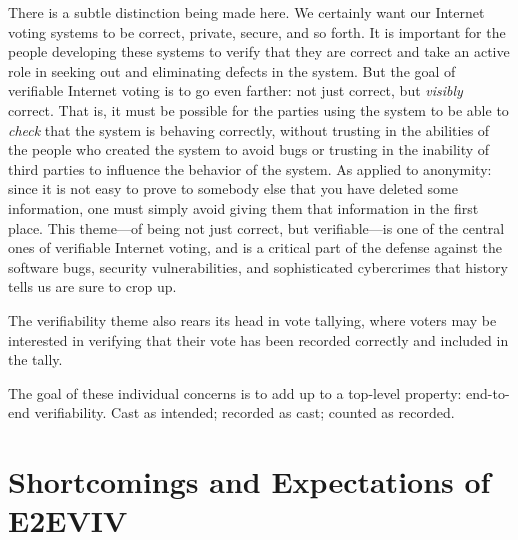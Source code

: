 There is a subtle distinction being made here. We certainly want our
Internet voting systems to be correct, private, secure, and so forth. It is
important for the people developing these systems to verify that they are
correct and take an active role in seeking out and eliminating defects in
the system. But the goal of verifiable Internet voting is to go even
farther: not just correct, but \emph{visibly} correct. That is, it must be
possible for the parties using the system to be able to \emph{check} that
the system is behaving correctly, without trusting in the abilities of the
people who created the system to avoid bugs or trusting in the inability of
third parties to influence the behavior of the system. As applied to
anonymity: since it is not easy to prove to somebody else that you have
deleted some information, one must simply avoid giving them that information
in the first place. This theme---of being not just correct, but
verifiable---is one of the central ones of verifiable Internet voting, and
is a critical part of the defense against the software bugs, security
vulnerabilities, and sophisticated cybercrimes that history tells us are
sure to crop up.

The verifiability theme also rears its head in vote tallying, where voters
may be interested in verifying that their vote has been recorded correctly
and included in the tally.

The goal of these individual concerns is to add up to a top-level property:
end-to-end verifiability. Cast as intended; recorded as cast; counted as
recorded.

\section{Shortcomings and Expectations of E2EVIV}
